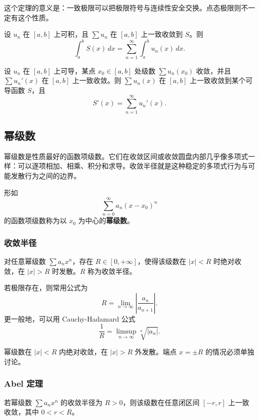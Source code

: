 这个定理的意义是：一致极限可以把极限符号与连续性安全交换。点态极限则不一定有这个性质。

\begin{theorem}[逐项积分]
设 $u_n$ 在 $[a,b]$ 上可积，且 $\sum u_n$ 在 $[a,b]$ 上一致收敛到 $S$。则
\[
    \int_a^b S(x)\,dx
    =\sum_{n=1}^{\infty}\int_a^b u_n(x)\,dx.
\]
\end{theorem}

\begin{theorem}[逐项求导]
设 $u_n$ 在 $[a,b]$ 上可导，某点 $x_0\in[a,b]$ 处级数 $\sum u_n(x_0)$ 收敛，并且 $\sum u_n'(x)$ 在 $[a,b]$ 上一致收敛。则 $\sum u_n(x)$ 在 $[a,b]$ 上一致收敛到某个可导函数 $S$，且
\[
    S'(x)=\sum_{n=1}^{\infty}u_n'(x).
\]
\end{theorem}

\subsection{幂级数}

幂级数是性质最好的函数项级数。它们在收敛区间或收敛圆盘内部几乎像多项式一样：可以逐项相加、相乘、积分和求导。收敛半径就是这种稳定的多项式行为与可能发散行为之间的边界。

\begin{definition}[幂级数]
形如
\[
    \sum_{n=0}^{\infty}a_n(x-x_0)^n
\]
的函数项级数称为以 $x_0$ 为中心的\textbf{幂级数}。
\end{definition}

\subsubsection{收敛半径}

\begin{theorem}[收敛半径]
对任意幂级数 $\sum a_nx^n$，存在 $R\in[0,+\infty]$，使得该级数在 $|x|<R$ 时绝对收敛，在 $|x|>R$ 时发散。$R$ 称为收敛半径。
\end{theorem}

若极限存在，则常用公式为
\[
    R=\lim_{n\to\infty}\left|\frac{a_n}{a_{n+1}}\right|.
\]
更一般地，可以用 Cauchy-Hadamard 公式
\[
    \frac1R=\limsup_{n\to\infty}\sqrt[n]{|a_n|}.
\]

幂级数在 $|x|<R$ 内绝对收敛，在 $|x|>R$ 外发散。端点 $x=\pm R$ 的情况必须单独讨论。

\subsubsection{Abel 定理}

\begin{theorem}[Abel 定理]
若幂级数 $\sum a_nx^n$ 的收敛半径为 $R>0$，则该级数在任意闭区间 $[-r,r]$ 上一致收敛，其中 $0<r<R$。
\end{theorem}

